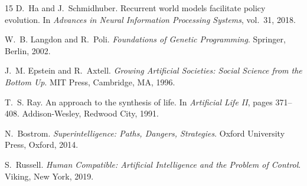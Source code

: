 \documentclass[11pt,a4paper]{article}
\begin{document}
\begin{thebibliography}{15}
D.~Ha and J.~Schmidhuber.
\newblock Recurrent world models facilitate policy evolution.
\newblock In \emph{Advances in Neural Information Processing Systems}, vol.~31, 2018.

W.~B. Langdon and R.~Poli.
\newblock \emph{Foundations of Genetic Programming}.
\newblock Springer, Berlin, 2002.

J.~M. Epstein and R.~Axtell.
\newblock \emph{Growing Artificial Societies: Social Science from the Bottom Up}.
\newblock MIT Press, Cambridge, MA, 1996.

T.~S. Ray.
\newblock An approach to the synthesis of life.
\newblock In \emph{Artificial Life II}, pages 371--408. Addison-Wesley, Redwood City, 1991.

N.~Bostrom.
\newblock \emph{Superintelligence: Paths, Dangers, Strategies}.
\newblock Oxford University Press, Oxford, 2014.

S.~Russell.
\newblock \emph{Human Compatible: Artificial Intelligence and the Problem of Control}.
\newblock Viking, New York, 2019.

\end{thebibliography}
\end{document}
